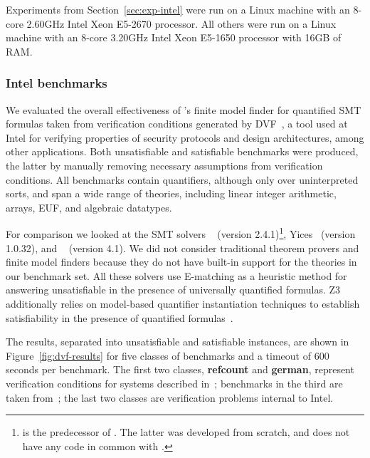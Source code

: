 \documentclass{svjour3}                     %
\begin{document}
Experiments from Section~\ref{sec:exp-intel}
were run on a Linux machine with an 8-core 2.60GHz 
Intel\textsuperscript{\textregistered} Xeon\textsuperscript{\textregistered} E5-2670 processor.
All others were run on a Linux machine with an 8-core 3.20GHz 
Intel\textsuperscript{\textregistered} Xeon\textsuperscript{\textregistered} E5-1650 processor with 16GB of RAM.

\subsubsection*{Intel benchmarks}
We evaluated the overall effectiveness of \cvc's finite model finder 
for quantified SMT formulas taken from verification conditions generated 
by DVF~\cite{GKLT12}, a tool used at Intel for verifying properties 
of security protocols and design architectures, among other applications.
Both unsatisfiable and satisfiable benchmarks were produced, 
the latter by manually removing necessary assumptions 
from verification conditions.
All benchmarks contain quantifiers, although only over uninterpreted sorts, and
span a wide range of theories, 
including linear integer arithmetic, arrays, EUF, and algebraic datatypes.

For comparison we looked at the SMT solvers \cvciii~\cite{BT07} (version 2.4.1)\footnote{\cvciii is the predecessor of \cvc.  
The latter was developed from scratch, and does not have any code in common with \cvciii.  
}, 
Yices~\cite{dutertre2006yices} (version 1.0.32), and \ziii~\cite{DeMoura:2008:ZES:1792734.1792766} (version 4.1).
We did not consider traditional theorem provers and finite model finders
because they do not have built-in support for the theories in our benchmark set.
All these solvers use E-matching as a heuristic method 
for answering unsatisfiable in the presence of universally quantified formulas.
Z3 additionally relies on model-based quantifier instantiation
techniques to establish satisfiability in the presence of quantified formulas~\cite{GeDeM-CAV-09}.

The results, separated into unsatisfiable and satisfiable instances, are shown
in Figure~\ref{fig:dvf-results} for five classes of benchmarks and 
a timeout of 600 seconds per benchmark.
The first two classes, {\bf refcount} and {\bf german}, represent 
verification conditions for systems described in~\cite{GKLT12}; 
benchmarks in the third are taken from~\cite{TG12}; 
the last two classes are verification problems internal to Intel.
\end{document}
